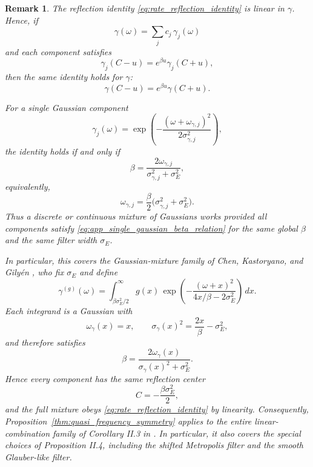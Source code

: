 \documentclass[showpacs,amsmath,amssymb,twocolumn,prx,superscriptaddress,10pt,aps,nofootinbib]{revtex4-2}
\newtheorem{remark}[theorem]{Remark}
\begin{document}
\begin{remark}
The reflection identity \eqref{eq:rate_reflection_identity} is linear in $\gamma$. Hence, if
\begin{equation}
\gamma(\omega)=\sum_j c_j\,\gamma_j(\omega)
\end{equation}
and each component satisfies
\begin{equation}
\gamma_j(C-u)=e^{\beta u}\gamma_j(C+u),
\end{equation}
then the same identity holds for $\gamma$:
\begin{equation}
\gamma(C-u)=e^{\beta u}\gamma(C+u).
\end{equation}

For a single Gaussian component
\begin{equation}
\gamma_j(\omega)=\exp\!\left(-\frac{(\omega+\omega_{\gamma,j})^2}{2\sigma_{\gamma,j}^2}\right),
\end{equation}
the identity holds if and only if
\begin{equation}
\label{eq:app_single_gaussian_beta_relation}
    \beta=\frac{2\omega_{\gamma,j}}{\sigma_{\gamma,j}^2+\sigma_E^2},
\end{equation}
equivalently,
\begin{equation}
\omega_{\gamma,j}=\frac{\beta}{2}\bigl(\sigma_{\gamma,j}^2+\sigma_E^2\bigr).
\end{equation}
Thus a discrete or continuous mixture of Gaussians works provided all components satisfy \eqref{eq:app_single_gaussian_beta_relation} for the same global $\beta$ and the same filter width $\sigma_E$.

In particular, this covers the Gaussian-mixture family of Chen, Kastoryano, and Gily\'en \cite{Chen2023a}, who fix $\sigma_E$ and define
\begin{equation}
\gamma^{(g)}(\omega)
=
\int_{\beta\sigma_E^2/2}^{\infty}
g(x)\,
\exp\!\left(
-\frac{(\omega+x)^2}{4x/\beta-2\sigma_E^2}
\right)\,dx.
\end{equation}
Each integrand is a Gaussian with
\begin{equation}
\omega_\gamma(x)=x,
\qquad
\sigma_\gamma(x)^2=\frac{2x}{\beta}-\sigma_E^2,
\end{equation}
and therefore satisfies
\begin{equation}
\beta=\frac{2\omega_\gamma(x)}{\sigma_\gamma(x)^2+\sigma_E^2}.
\end{equation}
Hence every component has the same reflection center
\begin{equation}
C=-\frac{\beta\sigma_E^2}{2},
\end{equation}
and the full mixture obeys \eqref{eq:rate_reflection_identity} by linearity. Consequently, Proposition~\ref{thm:quasi_frequency_symmetry} applies to the entire linear-combination family of Corollary II.3 in \cite{Chen2023a}. In particular, it also covers the special choices of Proposition II.4, including the shifted Metropolis filter and the smooth Glauber-like filter.


\end{remark}
\end{document}
